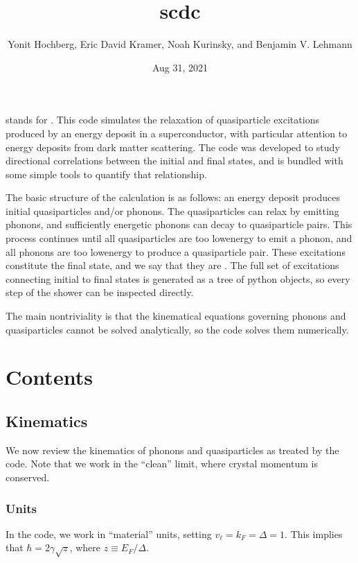 \documentclass[letterpaper,10pt,english]{sphinxmanual}
\title{scdc}
\date{Aug 31, 2021}
\author{Yonit Hochberg,
Eric David Kramer,
Noah Kurinsky,
and Benjamin V.\@{} Lehmann}
\begin{document}
\pagestyle{empty}
\sphinxmaketitle
\pagestyle{plain}
\sphinxtableofcontents
\pagestyle{normal}
\label{\detokenize{index::doc}}


 stands for . This code simulates the relaxation of quasiparticle excitations produced by an energy deposit in a superconductor, with particular attention to energy deposits from dark matter scattering. The code was developed to study directional correlations between the initial and final states, and is bundled with some simple tools to quantify that relationship.

The basic structure of the calculation is as follows: an energy deposit produces initial quasiparticles and/or phonons. The quasiparticles can relax by emitting phonons, and sufficiently energetic phonons can decay to quasiparticle pairs. This process continues until all quasiparticles are too low\sphinxhyphen{}energy to emit a phonon, and all phonons are too low\sphinxhyphen{}energy to produce a quasiparticle pair. These excitations constitute the final state, and we say that they are . The full set of excitations connecting initial to final states is generated as a tree of python objects, so every step of the shower can be inspected directly.

The main non\sphinxhyphen{}triviality is that the kinematical equations governing phonons and quasiparticles cannot be solved analytically, so the code solves them numerically.


\chapter{Contents}
\label{\detokenize{index:contents}}

\section{Kinematics}
\label{\detokenize{kinematics:kinematics}}\label{\detokenize{kinematics::doc}}
We now review the kinematics of phonons and quasiparticles as treated by the code. Note that we work in the “clean” limit, where crystal momentum is conserved.


\subsection{Units}
\label{\detokenize{kinematics:units}}
In the code, we work in “material” units, setting \(v_\ell = k_F = \Delta = 1\). This implies that \(\hbar = 2\gamma\sqrt z\), where \(z\equiv E_F/\Delta\).
\end{document}
